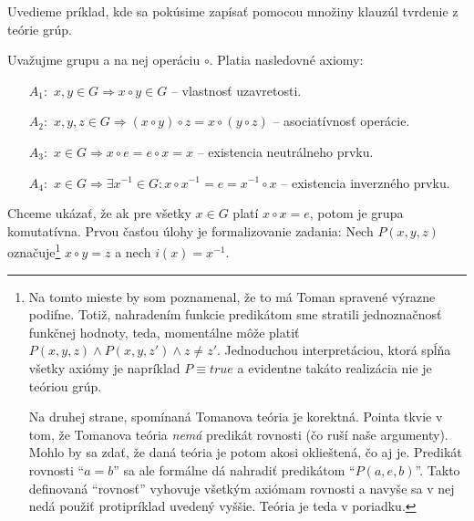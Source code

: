 \begin{priklad}
    Uvedieme príklad, kde sa pokúsime zapísať pomocou množiny
    klauzúl tvrdenie z teórie grúp. 

    \par Uvažujme grupu a na nej operáciu $\circ$.
    Platia nasledovné axiomy:
    \begin{itemize}
        \item [$A_1:$] $x, y \in G \Rightarrow x \circ y \in G$ --
                vlastnosť uzavretosti.
        \item [$A_2:$] $x, y, z \in G \Rightarrow 
                        (x \circ y) \circ z = x \circ (y \circ z)$ --
                asociatívnosť operácie.
        \item [$A_3:$] $x \in G \Rightarrow x \circ e = e \circ x = x$ --
                existencia neutrálneho prvku.
        \item [$A_4:$] $x \in G \Rightarrow \exists x^{-1} \in G :
                            x \circ x^{-1} = e = x^{-1} \circ x$ --
                existencia inverzného prvku.
    \end{itemize}

    Chceme ukázať, že ak pre všetky $x \in G$ platí $x \circ x = e$,
    potom je grupa komutatívna. Prvou časťou úlohy je formalizovanie zadania:
    Nech $P(x,y,z)$ označuje\footnote{ %
        Na tomto mieste by som poznamenal, že to má Toman spravené
        výrazne podifne.
        Totiž, nahradením funkcie predikátom sme stratili jednoznačnosť
        funkčnej hodnoty, teda, momentálne môže platiť
        $P(x,y,z) \land P(x,y,z') \land z \ne z'$. Jednoduchou
        interpretáciou, ktorá spĺňa všetky axiómy je napríklad
        $P \equiv true$ a evidentne takáto realizácia nie je teóriou grúp.

        Na druhej strane, spomínaná Tomanova teória je korektná.
        Pointa tkvie v tom, že Tomanova teória {\it nemá}
        predikát rovnosti (čo ruší naše argumenty). Mohlo by sa zdať,
        že daná teória je potom akosi oklieštená, čo aj je.
        Predikát rovnosti ``$a=b$'' sa ale formálne dá nahradiť predikátom
        ``$P(a,e,b)$''. Takto definovaná ``rovnosť'' vyhovuje všetkým
        axiómam rovnosti a navyše sa v nej nedá použiť protipríklad
        uvedený vyššie. Teória je teda v poriadku.
    }
    $x \circ y = z$ a nech  $i(x) = x^{-1}$.


\end{priklad}
